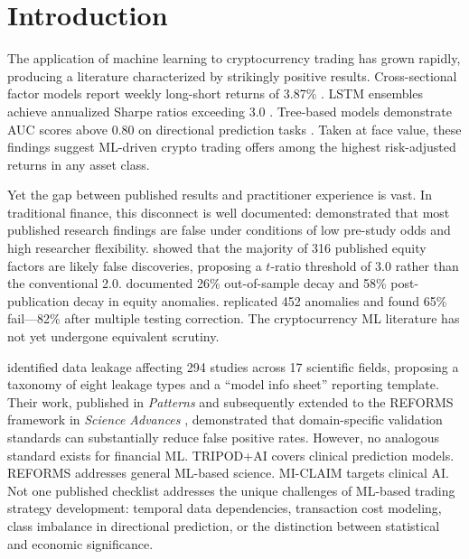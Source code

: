 \documentclass[preprint,12pt,authoryear]{elsarticle}
\begin{document}
\section{Introduction}
\label{sec:intro}

The application of machine learning to cryptocurrency trading has grown rapidly, producing a literature characterized by strikingly positive results. Cross-sectional factor models report weekly long-short returns of 3.87\% \citep{fieberg2025ctrend}. LSTM ensembles achieve annualized Sharpe ratios exceeding 3.0 \citep{xu2022machine}. Tree-based models demonstrate AUC scores above 0.80 on directional prediction tasks \citep{li2024cryptocurrency}. Taken at face value, these findings suggest ML-driven crypto trading offers among the highest risk-adjusted returns in any asset class.

Yet the gap between published results and practitioner experience is vast. In traditional finance, this disconnect is well documented: \citet{ioannidis2005false} demonstrated that most published research findings are false under conditions of low pre-study odds and high researcher flexibility. \citet{harvey2016cross} showed that the majority of 316 published equity factors are likely false discoveries, proposing a $t$-ratio threshold of 3.0 rather than the conventional 2.0. \citet{mclean2016academic} documented 26\% out-of-sample decay and 58\% post-publication decay in equity anomalies. \citet{hou2020replicating} replicated 452 anomalies and found 65\% fail---82\% after multiple testing correction. The cryptocurrency ML literature has not yet undergone equivalent scrutiny.

\citet{kapoor2023leakage} identified data leakage affecting 294 studies across 17 scientific fields, proposing a taxonomy of eight leakage types and a ``model info sheet'' reporting template. Their work, published in \textit{Patterns} and subsequently extended to the REFORMS framework in \textit{Science Advances} \citep{kapoor2024reforms}, demonstrated that domain-specific validation standards can substantially reduce false positive rates. However, no analogous standard exists for financial ML. TRIPOD+AI \citep{collins2024tripodai} covers clinical prediction models. REFORMS addresses general ML-based science. MI-CLAIM \citep{norgeot2020mi} targets clinical AI. Not one published checklist addresses the unique challenges of ML-based trading strategy development: temporal data dependencies, transaction cost modeling, class imbalance in directional prediction, or the distinction between statistical and economic significance.
\end{document}
